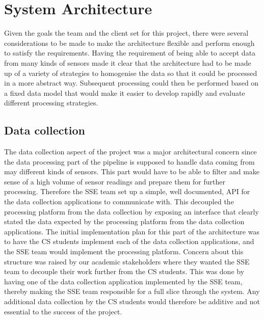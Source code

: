 \documentclass[prodmode,acmtosem]{acmsmall} %
\begin{document}
\section{System Architecture}
\label{architecture}
Given the goals the team and the client set for this project, there were several considerations to be made to make the architecture flexible and perform enough to satisfy the requirements. Having the requirement of being able to accept data from many kinds of sensors made it clear that the architecture had to be made up of a variety of strategies to homogenise the data so that it could be processed in a more abstract way. Subsequent processing could then be performed based on a fixed data model that would make it easier to develop rapidly and evaluate different processing strategies.

\subsection{Data collection}
\label{dataCollection}
The data collection aspect of the project was a major architectural concern since the data processing part of the pipeline is supposed to handle data coming from may different kinds of sensors. This part would have to be able to filter and make sense of a high volume of sensor readings and prepare them for further processing. Therefore the SSE team set up a simple, well documented, API for the data collection applications to communicate with. This decoupled the processing platform from the data collection by exposing an interface that clearly stated the data expected by the processing platform from the data collection applications.
The initial implementation plan for this part of the architecture was to have the CS students implement each of the data collection applications, and the SSE team would implement the processing platform.
Concern about this structure was raised by our academic stakeholders where they wanted the SSE team to decouple their work further from the CS students. This was done by having one of the data collection application implemented by the SSE team, thereby making the SSE team responsible for a full slice through the system. Any additional data collection by the CS students would therefore be additive and not essential to the success of the project.
\end{document}

